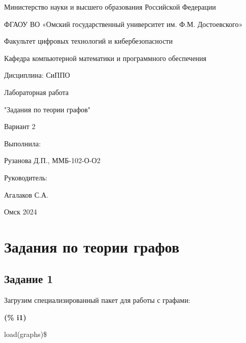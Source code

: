 \documentclass[fleqn]{article}
\begin{document}
\thispagestyle{empty}
\begin{center}
\setlength{\baselineskip}{8pt}

Министерство науки и высшего образования Российской Федерации

ФГАОУ ВО «Омский государственный университет им. Ф.М. Достоевского»

Факультет цифровых технологий и кибербезопасности

Кафедра компьютерной математики и программного обеспечения

Дисциплина: СиППО
\setlength{\baselineskip}{12pt}

\vspace*{15\baselineskip}
Лабораторная работа

"Задания по теории графов"

Вариант 2
\end{center}
\vspace*{10\baselineskip}
\begin{flushright}
    Выполнила:

Рузанова Д.П., ММБ-102-О-О2

Руководитель:

Агалаков С.А.
\end{flushright}
\vspace*{6\baselineskip}
\begin{center}
Омск 2024    
\end{center}
\newpage
\tableofcontents
\newpage
\section*{Задания по теории графов}
\subsection*{Задание 1}
Загрузим специализированный пакет для работы с графами:\\

\noindent
\begin{minipage}[t]{4.000000em}\color{red}\bfseries
(\% i1)	
\end{minipage}
\begin{minipage}[t]{\textwidth}\color{blue}
load(graphs)\$
\end{minipage}

\noindent%
\end{document}
